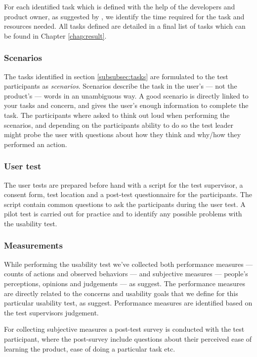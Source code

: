 For each identified task which is defined with the help of the developers and product owner, as suggested by \cite{Dumas1999}, we identify the time required for the task and resources needed. All tasks defined are detailed in a final list of tasks which can be found in Chapter \ref{chap:result}.

\subsubsection{Scenarios}
The tasks identified in section \ref{subsubsec:tasks} are formulated to the test participants as \textit{scenarios}. Scenarios describe the task in the user's --- not the product's --- words in an unambiguous way. A good scenario is directly linked to your tasks and concern, and gives the user's enough information to complete the task. The participants where asked to think out loud when performing the scenarios, and depending on the participants ability to do so the test leader might probe the user with questions about how they think and why/how they performed an action.

\subsubsection{User test}
The user tests are prepared before hand with a script for the test supervisor, a consent form, test location and a post-test questionnaire for the participants. The script contain common questions to ask the participants during the user test. A pilot test is carried out for practice and to identify any possible problems with the usability test.

\subsubsection{Measurements}
\label{subsubsec:measurements}
While performing the usability test we've collected both performance measures --- counts of actions and observed behaviors --- and subjective measures --- people's perceptions, opinions and judgements --- as \cite{Dumas1999} suggest.
The performance measures are directly related to the concerns and usability goals that we define for this particular usability test, as \cite{Dumas1999} suggest. Performance measures are identified based on the test supervisors judgement.

For collecting subjective measures a post-test survey is conducted with the test participant, where the post-survey include questions about their perceived ease of learning the product, ease of doing a particular task etc.
